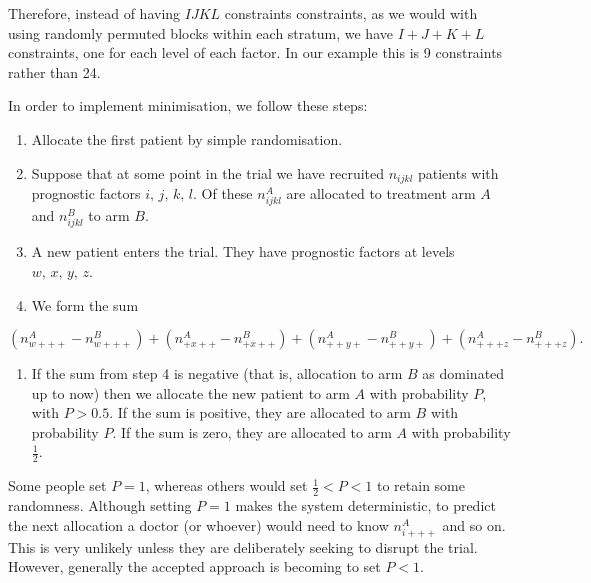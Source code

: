 \documentclass[
  openany]{book}
\providecommand{\tightlist}{%
  \setlength{\itemsep}{0pt}\setlength{\parskip}{0pt}}
\theoremstyle{definition}
\theoremstyle{definition}
\theoremstyle{definition}
\theoremstyle{definition}
\theoremstyle{remark}
\begin{document}
Therefore, instead of having \(IJKL\) constraints constraints, as we would with using randomly permuted blocks within each stratum, we have \(I+J+K+L\) constraints, one for each level of each factor. In our example this is 9 constraints rather than 24.

In order to implement minimisation, we follow these steps:

\begin{enumerate}
\def\labelenumi{\arabic{enumi}.}
\tightlist
\item
  Allocate the first patient by simple randomisation.
\item
  Suppose that at some point in the trial we have recruited \(n_{ijkl}\) patients with prognostic factors \(i,\,j,\,k,\,l\). Of these \(n^A_{ijkl}\) are allocated to treatment arm \(A\) and \(n^B_{ijkl}\) to arm \(B\).
\item
  A new patient enters the trial. They have prognostic factors at levels \(w,\,x,\,y,\,z\).
\item
  We form the sum
\end{enumerate}

\begin{equation}
  \left(n^A_{w+++} - n^B_{w+++}\right) + \left(n^A_{+x++} - n^B_{+x++}\right) + \left(n^A_{++y+} - n^B_{++y+}\right) + \left(n^A_{+++z} - n^B_{+++z}\right).
  \label{eq:minim}
  \end{equation}

\begin{enumerate}
\def\labelenumi{\arabic{enumi}.}
\setcounter{enumi}{4}
\tightlist
\item
  If the sum from step 4 is negative (that is, allocation to arm \(B\) as dominated up to now) then we allocate the new patient to arm \(A\) with probability \(P\), with \(P>0.5\). If the sum is positive, they are allocated to arm \(B\) with probability \(P\). If the sum is zero, they are allocated to arm \(A\) with probability \(\frac{1}{2}\).
\end{enumerate}

Some people set \(P=1\), whereas others would set \(\frac{1}{2}<P<1\) to retain some randomness. Although setting \(P=1\) makes the system deterministic, to predict the next allocation a doctor (or whoever) would need to know \(n^A_{i+++}\) and so on. This is very unlikely unless they are deliberately seeking to disrupt the trial. However, generally the accepted approach is becoming to set \(P<1\).
\end{document}
